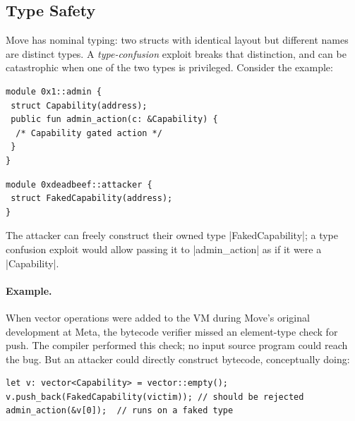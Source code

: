\subsection{Type Safety}
\label{sec:type}

Move has nominal typing: two structs with identical layout but different names are distinct types.
A \emph{type-confusion} exploit breaks that distinction, and can be catastrophic when one of the two types is privileged.
Consider the example:

\noindent
\begin{minipage}[t]{0.53\linewidth}
\begin{lstlisting}[language=Move,style=MoveStyle,basicstyle=\relsize{-2}\ttfamily,keywordstyle=\color{blue},frame=single,frameround=tttt,framesep=4pt,rulecolor=\color{gray!60},backgroundcolor=\color{gray!4}]
module 0x1::admin {
 struct Capability(address);
 public fun admin_action(c: &Capability) {
  /* Capability gated action */
 }
}
\end{lstlisting}
\end{minipage}\hfill
\begin{minipage}[t]{0.43\linewidth}
\begin{lstlisting}[language=Move,style=MoveStyle,basicstyle=\relsize{-2}\ttfamily,keywordstyle=\color{blue},frame=single,frameround=tttt,framesep=4pt,rulecolor=\color{gray!60},backgroundcolor=\color{gray!4}]
module 0xdeadbeef::attacker {
 struct FakedCapability(address);
}
\end{lstlisting}
\end{minipage}

\noindent The attacker can freely construct their owned type |FakedCapability|; a type confusion exploit would allow passing it to |admin_action| as if it were a |Capability|.

\paragraph{Example.}
When vector operations were added to the VM during Move's original development at Meta, the bytecode verifier missed an element-type check for push.
The compiler performed this check; no input source program could reach the bug.
But an attacker could directly construct bytecode, conceptually doing:

\noindent\hfil\begin{minipage}{0.78\linewidth}
\begin{lstlisting}[language=Move,style=MoveStyle,basicstyle=\relsize{-2}\ttfamily,keywordstyle=\color{blue},frame=single,frameround=tttt,framesep=4pt,rulecolor=\color{gray!60},backgroundcolor=\color{gray!4}]
let v: vector<Capability> = vector::empty();
v.push_back(FakedCapability(victim)); // should be rejected
admin_action(&v[0]);  // runs on a faked type
\end{lstlisting}
\end{minipage}\hfil

